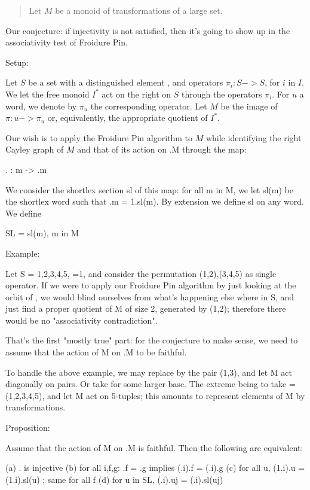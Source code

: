 \documentclass[12pt]{amsart}
\newcommand{\p}{\mathbb{1}} %
\begin{document}
\begin{abstract}
  Let $M$ be a monoid of transformations of a large set.
\end{abstract}

Our conjecture: if injectivity is not satisfied, then it's going to
show up in the associativity test of Froidure Pin.


Setup:

    Let $S$ be a set with a distinguished element \p, and operators $\pi_i: S -> S$, for $i$ in $I$. We let
    the free monoid $I^*$ act on the right on $S$ through the operators
    $\pi_i$. For $u$ a word, we denote by $\pi_u$ the corresponding operator.
    Let $M$ be the image of $\pi: u-> \pi_u$ or, equivalently, the
    appropriate quotient of $I^*$.

    Our wish is to apply the Froidure Pin algorithm to $M$ while
    identifying the right Cayley graph of $M$ and that of its action on
    \p.M through the map:

        \p.  :   m  ->  \p.m

    We consider the shortlex section sl of this map: for all m in M,
    we let sl(m) be the shortlex word such that \p.m = 1.sl(m). By
    extension we define sl on any word. We define

        SL = { sl(m),  m in M }

Example:

    Let S = {1,2,3,4,5}, \p =1, and consider the permutation
    (1,2),(3,4,5) as single operator. If we were to apply our Froidure
    Pin algorithm by just looking at the orbit of \p, we would blind
    ourselves from what's happening else where in S, and just find a
    proper quotient of M of size 2, generated by (1,2); therefore
    there would be no "associativity contradiction".

That's the first "mostly true" part: for the conjecture to make sense,
we need to assume that the action of M on \p.M to be faithful.

To handle the above example, we may replace \p by the pair (1,3), and
let M act diagonally on pairs. Or take for \p some larger base. The
extreme being to take \p = (1,2,3,4,5), and let M act on 5-tuples;
this amounts to represent elements of M by transformations.

Proposition:

    Assume that the action of M on \p.M is faithful.
    Then the following are equivalent:

    (a)  \p. is injective
    (b)  for all i,f,g:       \p.f = \p.g implies (\p.i).f = (\p.i).g
    (c)  for all u,           (1.i).u = (1.i).sl(u) ;  same for all f
    (d)  for u in SL,         (\p.i).uj = (\p.i).sl(uj)
\end{document}
